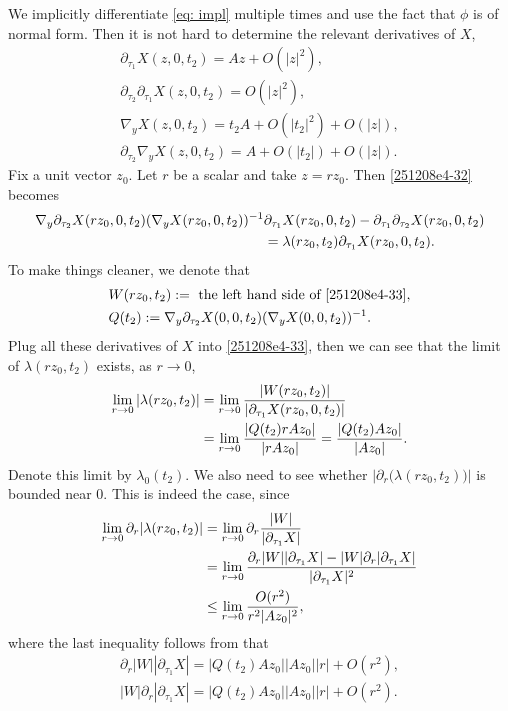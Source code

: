 \documentclass{article}
\numberwithin{equation}{section}
\theoremstyle{plain}
\begin{document}
We implicitly differentiate \eqref{eq: impl} multiple times and use the fact that $\phi$ is of normal form. Then it is not hard to determine the relevant derivatives of $X$,
\begin{align*}
    \partial_{\tau_1} X(z,0,t_2)= A z+ O(|z|^2),\\
    \partial_{\tau_2} \partial_{\tau_1} X(z,0,t_2)= O(|z|^2),\\
    \nabla_y X(z,0,t_2)= t_2A+ O(|t_2|^2)+ O(|z|), \\
    \partial_{\tau_2}\nabla_y X(z,0,t_2)= A+ O(|t_2|)+ O(|z|).
\end{align*}
Fix a unit vector $z_0$. Let $r$ be a scalar and take $z=rz_0$. Then \eqref{251208e4-32} becomes
\begin{align}\label{251208e4-33}
    \nabla_y \partial_{\tau_2} X(rz_0, 0, t_2)  
     (\nabla_y X(rz_0, 0, t_2))^{-1}& \partial_{\tau_1} X(rz_0, 0, t_2) - \partial_{\tau_1} \partial_{\tau_2} X(rz_0, 0, t_2)\notag\\
     &= \lambda(rz_0,t_2)\partial_{\tau_1} X(rz_0, 0, t_2).
\end{align}
To make things cleaner, we denote that
\begin{align}
    & W(rz_0,t_2):=\text{ the left hand side of \eqref{251208e4-33}},   \\
    & Q(t_2):= \nabla_y \partial_{\tau_2} X(0,0,t_2)  
     (\nabla_y X(0,0,t_2))^{-1}.
\end{align}
Plug all these derivatives of $X$ into \eqref{251208e4-33}, then we can see that the limit of $\lambda(rz_0,t_2)$ exists, as $r\to 0$,
\begin{align}
    \lim_{r\to 0} |\lambda(rz_0,t_2)| &=  \lim_{r\to 0} \frac{|W(rz_0,t_2)|}{|\partial_{\tau_1} X(rz_0,0,t_2)|} \notag \\
     &= \lim_{r\to 0} \frac{|Q(t_2)rAz_0|}{|rAz_0|}= \frac{|Q(t_2)Az_0|}{|Az_0|}.
\end{align}
Denote this limit by $\lambda_0(t_2)$. We also need to see whether $|\partial_r\big(\lambda(rz_0,t_2)\big)|$ is bounded near 0. This is indeed the case, since
\begin{align}
    \lim_{r\to 0} \partial_r |\lambda(rz_0,t_2)| &= \lim_{r\to 0} \partial_r\frac{|W|}{|\partial_{\tau_1} X|} \notag \\
     &= \lim_{r\to 0} \frac{\partial_r|W||\partial_{\tau_1} X|-|W|\partial_r |\partial_{\tau_1} X|}{|\partial_{\tau_1} X|^2} \\
     &\leq \lim_{r\to 0} \frac{O(r^2)}{r^2|Az_0|^2},
\end{align}
where the last inequality follows from that 
\begin{align}
    \partial_r|W||\partial_{\tau_1} X|= |Q(t_2)Az_0||Az_0||r|+O(r^2), \\
    |W|\partial_r |\partial_{\tau_1} X|= |Q(t_2)Az_0||Az_0||r|+O(r^2).
\end{align}
\end{document}
